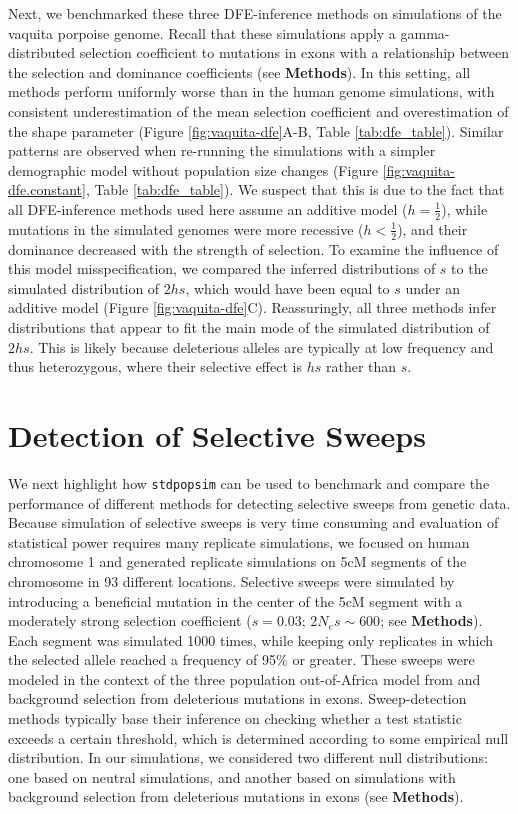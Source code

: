 \documentclass[hidelinks]{article}
\newcommand{\stdpopsim}{\texttt{stdpopsim}\xspace}
\begin{document}
    Next, we benchmarked these three DFE-inference methods on simulations of the vaquita porpoise genome.
    Recall that these simulations apply a gamma-distributed selection coefficient to mutations in exons
    with a relationship between the selection and dominance coefficients (see \textbf{Methods}).
    In this setting, all methods perform uniformly worse than in the human genome simulations,
    with consistent underestimation of the mean selection coefficient
    and overestimation of the shape parameter (Figure \ref{fig:vaquita-dfe}A-B, Table \ref{tab:dfe_table}).
    Similar patterns are observed when re-running the simulations with a simpler demographic model
    without population size changes (Figure \ref{fig:vaquita-dfe.constant}, Table \ref{tab:dfe_table}).
    We suspect that this is due to the fact that all DFE-inference methods used here assume an additive model ($h = \frac{1}{2}$),
    while mutations in the simulated genomes were more recessive ($h < \frac{1}{2}$), and their dominance decreased with the strength of selection.
    To examine the influence of this model misspecification, we compared the inferred distributions of $s$ to the
    simulated distribution of $2hs$, which would have been equal to $s$ under an additive model (Figure \ref{fig:vaquita-dfe}C).
    Reassuringly, all three methods infer distributions that appear to fit the main mode of the simulated distribution of $2hs$.
    This is likely because deleterious alleles are typically at low frequency and thus heterozygous,
    where their selective effect is $h s$ rather than $s$.

\section*{Detection of Selective Sweeps}
    \label{sweeps}
    We next highlight how \stdpopsim can be used to benchmark and compare
    the performance of different methods for detecting selective sweeps from genetic data.
    Because simulation of selective sweeps is very time consuming and evaluation of statistical power requires
    many replicate simulations, we focused on human chromosome 1 and generated replicate simulations on 5cM segments
    of the chromosome in 93 different locations. %
    Selective sweeps were simulated by introducing a beneficial mutation in the center of the 5cM segment
    with a moderately strong selection coefficient ($s = 0.03$; $2N_es \sim 600$; see \textbf{Methods}).
    Each segment was simulated 1000 times, while keeping only replicates in which the selected allele reached a frequency of 95\% or greater.
    These sweeps were modeled in the context of the three population out-of-Africa model from \citet{gutenkunst2009inferring}
    and background selection from deleterious mutations in exons.
    Sweep-detection methods typically base their inference on checking whether a test statistic
    exceeds a certain threshold, which is determined according to some empirical null distribution.
    In our simulations, we considered two different null distributions:
    one based on neutral simulations, and another based on simulations with background selection
    from deleterious mutations in exons (see \textbf{Methods}).
\end{document}
